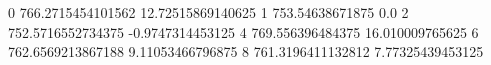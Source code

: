 0 766.2715454101562 12.72515869140625
1 753.54638671875 0.0
2 752.5716552734375 -0.9747314453125
4 769.556396484375 16.010009765625
6 762.6569213867188 9.11053466796875
8 761.3196411132812 7.77325439453125
